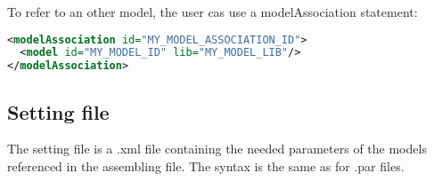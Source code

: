 \documentclass[a4paper, 12pt]{report}
\begin{document}
To refer to an other model, the user cas use a modelAssociation statement:

\begin{lstlisting}[language=XML, morekeywords={modelAssociation}]
<modelAssociation id="MY_MODEL_ASSOCIATION_ID">
  <model id="MY_MODEL_ID" lib="MY_MODEL_LIB"/>
</modelAssociation>
\end{lstlisting}

\subsection{Setting file}

The setting file is a .xml file containing the needed parameters of the models referenced in the assembling file. The syntax is the same as for .par files.
\end{document}
